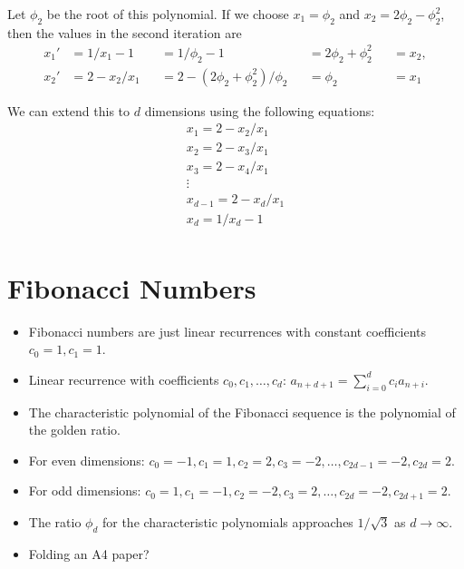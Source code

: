 \documentclass[english,version-2020-11]{uzl-thesis}
\begin{document}
Let $\phi_2$ be the root of this polynomial.
If we choose $x_1 = \phi_2$ and $x_2 = 2\phi_2 - \phi_2^2$,
then the values in the second iteration are
\[\begin{aligned}
  x_1' & = 1 / x_1 - 1   &  & = 1 / \phi_2 - 1                    &  & = 2\phi_2 + \phi_2^2 &  & = x_2, \\
  x_2' & = 2 - x_2 / x_1 &  & = 2 - (2\phi_2 + \phi_2^2) / \phi_2 &  & = \phi_2             &  & = x_1
\end{aligned}\]

We can extend this to $d$ dimensions using the following equations:
\begin{align*}
  x_1 = 2 - x_2 / x_1 \\
  x_2 = 2 - x_3 / x_1 \\
  x_3 = 2 - x_4 / x_1 \\
  \vdots \\
  x_{d-1} = 2 - x_d / x_1 \\
  x_d = 1 / x_d - 1 \\
\end{align*}


\section{Fibonacci Numbers}

\begin{itemize}
  \item Fibonacci numbers are just linear recurrences with constant coefficients $c_0 = 1, c_1 = 1$.
  \item Linear recurrence with coefficients $c_0, c_1, \dots, c_d$: $a_{n+d+1} = \sum_{i=0}^d c_i a_{n+i}$.
  \item The characteristic polynomial of the Fibonacci sequence is the polynomial of the golden ratio.
  \item For even dimensions: $c_0 = -1, c_1 = 1, c_2 = 2, c_3 = -2, \dots, c_{2d-1} = -2, c_{2d} = 2$.
  \item For odd dimensions:  $c_0 = 1, c_1 = -1, c_2 = -2, c_3 = 2, \dots, c_{2d} = -2, c_{2d+1} = 2$.
  \item The ratio $\phi_d$ for the characteristic polynomials approaches $1/\sqrt{3}$ as $d \to \infty$.
  \item Folding an A4 paper?
\end{itemize}
\end{document}
